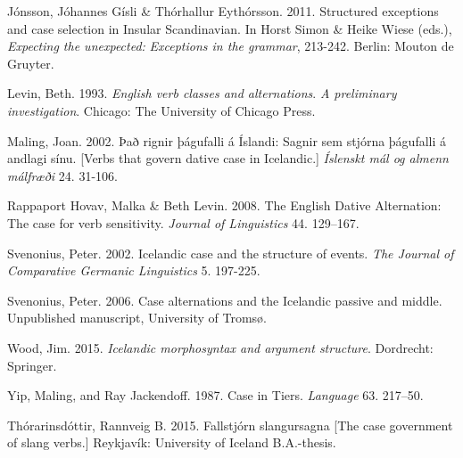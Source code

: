 \begin{styleStandard}
Jónsson, Jóhannes Gísli \& Thórhallur Eythórsson. 2011. Structured exceptions and case selection in Insular Scandinavian. In Horst Simon \& Heike Wiese (eds.),\textit{ Expecting the unexpected:} \textit{Exceptions in the grammar}, 213-242. Berlin: Mouton de Gruyter.
\end{styleStandard}

\begin{styleStandard}
Levin, Beth. 1993. \textit{English verb classes and alternations}. \textit{A preliminary investigation}. Chicago: The University of Chicago Press.
\end{styleStandard}

\begin{styleStandard}
Maling, Joan. 2002. Það rignir þágufalli á Íslandi: Sagnir sem stjórna þágufalli á andlagi sínu. [Verbs that govern dative case in Icelandic.] \textit{Íslenskt mál og almenn málfræði} 24. 31-106. 
\end{styleStandard}

\begin{styleStandard}
Rappaport Hovav, Malka \& Beth Levin. 2008. The English Dative Alternation: The case for verb sensitivity. \textit{Journal of Linguistics }44. 129–167.
\end{styleStandard}

\begin{styleStandard}
Svenonius, Peter. 2002. Icelandic case and the structure of events. \textit{The Journal of Comparative Germanic Linguistics} 5. 197-225. 
\end{styleStandard}

\begin{styleStandard}
Svenonius, Peter. 2006. Case alternations and the Icelandic passive and middle. Unpublished manuscript, University of Tromsø.
\end{styleStandard}

\begin{styleStandard}
Wood, Jim. 2015. \textit{Icelandic morphosyntax and argument structure}. Dordrecht: Springer.
\end{styleStandard}

\begin{styleStandard}
Yip, Maling, and Ray Jackendoff. 1987. Case in Tiers. \textit{Language} 63. 217–50.
\end{styleStandard}

\begin{styleStandard}
Thórarinsdóttir, Rannveig B. 2015. Fallstjórn slangursagna [The case government of slang verbs.] Reykjavík: University of Iceland B.A.-thesis.
\end{styleStandard}

